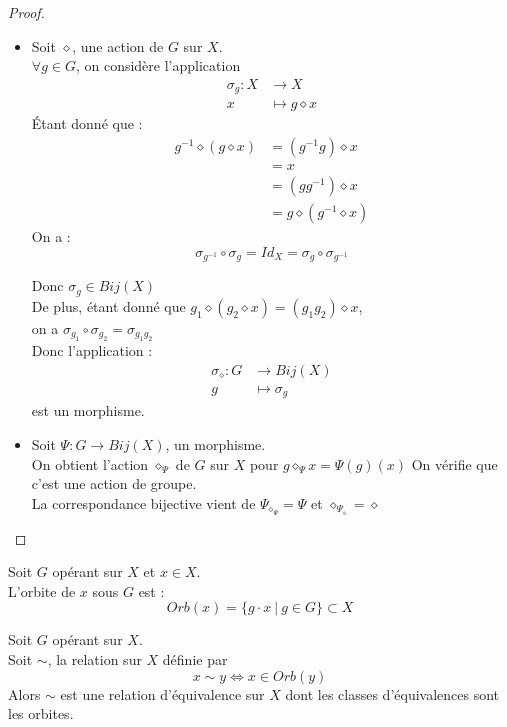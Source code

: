 \documentclass[../main.tex]{subfile}
\begin{document}
\begin{proof}
\begin{itemize}
	\item Soit $\diamond$, une action de $G$ sur $X$.\\
	$\forall g \in G$, on considère l'application 
		$$
	\begin{aligned}
		\sigma_g : X &\to X\\
		x &\mapsto g \diamond x
	\end{aligned}
		$$
	\'Etant donné que :
	$$
\begin{aligned}
	g^{-1} \diamond (g \diamond x) &= (g^{-1}g) \diamond x \\
	&= x\\
	&= (gg^{-1}) \diamond x\\
	&= g \diamond (g^{-1} \diamond x)
\end{aligned}
	$$
	On a :
	$$\sigma_{g^{-1}} \circ \sigma_g = Id_X = \sigma_g \circ \sigma_{g^{-1}}$$

	Donc $\sigma_g \in Bij(X)$\\
	De plus, étant donné que $g_1 \diamond (g_2 \diamond x) = (g_1g_2) \diamond x$, \\
	on a $\sigma_{g_1} \circ \sigma_{g_2} = \sigma_{g_1g_2}$\\

	Donc l'application :
		$$
	\begin{aligned}
		\sigma_\diamond : G &\to Bij(X)\\
		g &\mapsto \sigma_g
	\end{aligned}
		$$
	est un morphisme.


	\item Soit $\Psi : G \to Bij(X)$, un morphisme.\\
	On obtient l'action $\diamond_\Psi$ de $G$ sur $X$ pour $g \diamond_\Psi x = \Psi(g)(x)$
	On vérifie que c'est une action de groupe.\\
	La correspondance bijective vient de $\Psi_{\diamond_\Psi} = \Psi$ et $\diamond_{\Psi_\diamond} = \diamond$
\end{itemize}
\end{proof}

\begin{defi}
	Soit $G$ opérant sur $X$ et $x \in X$.\\
	L'orbite de $x$ sous $G$ est :
	$$Orb(x) = \{g \cdot x \ | \ g \in G\} \subset X$$
\end{defi}

\begin{prop}
	Soit $G$ opérant sur $X$.\\
	Soit $\sim$, la relation sur $X$ définie par 
	$$x \sim y \Leftrightarrow x \in Orb(y)$$
	Alors $\sim$ est une relation d'équivalence sur $X$ dont les classes d'équivalences sont les orbites.
\end{prop}
\end{document}

